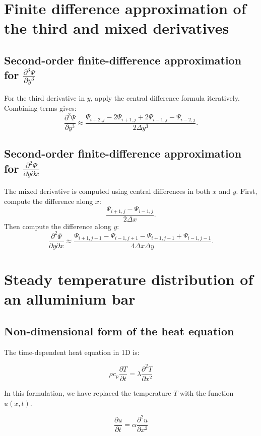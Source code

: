 \documentclass{article}
\begin{document}
\section{Finite difference approximation of the third and mixed derivatives}

\subsection{Second-order finite-difference approximation for \texorpdfstring{$\frac{\partial^3 \Psi}{\partial y^3}$}{d3Psi/dy3}}
For the third derivative in \(y\), apply the central difference formula iteratively. Combining terms gives:
\[
\frac{\partial^3 \Psi}{\partial y^3} \approx \frac{\Psi_{i+2, j} - 2\Psi_{i+1, j} + 2\Psi_{i-1, j} - \Psi_{i-2, j}}{2 \Delta y^3}.
\]

\subsection{Second-order finite-difference approximation for \texorpdfstring{$\frac{\partial^2 \Psi}{\partial y \partial x}$}{d2Psi/dy dx}}
The mixed derivative is computed using central differences in both \(x\) and \(y\). First, compute the difference along \(x\):
\[
\frac{\Psi_{i+1, j} - \Psi_{i-1, j}}{2\Delta x}.
\]
Then compute the difference along \(y\):
\[
\frac{\partial^2 \Psi}{\partial y \partial x} \approx \frac{\Psi_{i+1, j+1} - \Psi_{i-1, j+1} - \Psi_{i+1, j-1} + \Psi_{i-1, j-1}}{4 \Delta x \Delta y}.
\]




\section{Steady temperature distribution of an alluminium bar}

\subsection{Non-dimensional form of the heat equation}

The time-dependent heat equation in 1D is:

\[
\rho c_p \frac{\partial T}{\partial t} = \lambda \frac{\partial^2 T}{\partial x^2}
\]

In this formulation, we have replaced the temperature \(T\) with the function \(u(x, t)\).

\[
\frac{\partial u}{\partial t} = \alpha \frac{\partial^2 u}{\partial x^2}
\]
\end{document}

